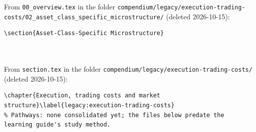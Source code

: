 \documentclass[a4paper,oneside,openany]{book}
\begin{document}
{\raggedright\noindent From \nolinkurl{00_overview.tex} in the folder \nolinkurl{compendium/legacy/execution-trading-costs/}\allowbreak\nolinkurl{02_asset_class_specific_microstructure/} (deleted 2026-10-15):\par}
{\scriptsize
\begin{verbatim}
\section{Asset-Class-Specific Microstructure}



\end{verbatim}
}

\noindent From \nolinkurl{section.tex} in the folder \nolinkurl{compendium/legacy/execution-trading-costs/} (deleted 2026-10-15):
{\scriptsize
\begin{verbatim}
\chapter{Execution, trading costs and market structure}\label{legacy:execution-trading-costs}
% Pathways: none consolidated yet; the files below predate the learning guide's study method.


\end{verbatim}
}
\end{document}
